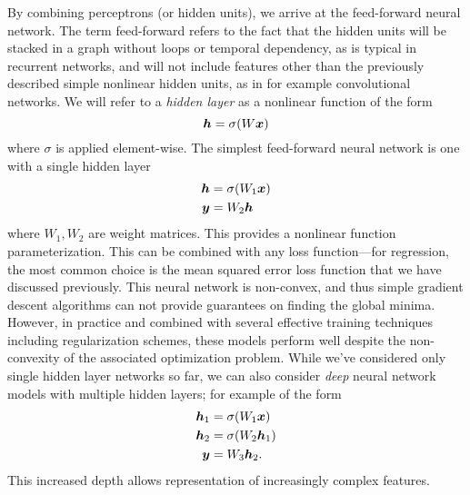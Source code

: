 By combining perceptrons (or hidden units), we arrive at the feed-forward neural network. The term feed-forward refers to the fact that the hidden units will be stacked in a graph without loops or temporal dependency, as is typical in recurrent networks, and will not include features other than the previously described simple nonlinear hidden units, as in for example convolutional networks. We will refer to a \textit{hidden layer} as a nonlinear function of the form
\begin{equation}
    \bm{h} = \sigma(W \bm{x})
\end{equation}
where $\sigma$ is applied element-wise. The simplest feed-forward neural network is one with a single hidden layer
\begin{align}
    \bm{h} &= \sigma( W_1 \bm{x})\\
    \bm{y} &= W_2 \bm{h}
\end{align}
where $W_1, W_2$ are weight matrices. This provides a nonlinear function parameterization. This can be combined with any loss function---for regression, the most common choice is the mean squared error loss function that we have discussed previously. This neural network is non-convex, and thus simple gradient descent algorithms can not provide guarantees on finding the global minima. However, in practice and combined with several effective training techniques including regularization schemes, these models perform well despite the non-convexity of the associated optimization problem. While we've considered only single hidden layer networks so far, we can also consider \textit{deep} neural network models with multiple hidden layers; for example of the form
\begin{align}
    \bm{h}_1 &= \sigma( W_1 \bm{x})\\
    \bm{h}_2 &= \sigma( W_2 \bm{h}_1)\\
    \bm{y} &= W_3 \bm{h}_2.
\end{align}
This increased depth allows representation of increasingly complex features. 



